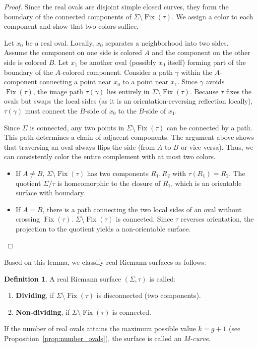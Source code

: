 \documentclass[11pt,a4paper]{article}
\theoremstyle{definition}
\newtheorem*{definition}{Definition}
\DeclareMathOperator{\fix}{\mathrm{Fix}}
\begin{document}
\begin{proof}
	Since the real ovals are disjoint simple closed curves, they form the boundary of the connected components of $\Sigma \setminus \fix(\tau)$. We assign a color to each component and show that two colors suffice.
	
	Let $x_0$ be a real oval. Locally, $x_0$ separates a neighborhood into two sides. Assume the component on one side is colored $A$ and the component on the other side is colored $B$. Let $x_1$ be another oval (possibly $x_0$ itself) forming part of the boundary of the $A$-colored component. Consider a path $\gamma$ within the $A$-component connecting a point near $x_0$ to a point near $x_1$.
	Since $\gamma$ avoids $\fix(\tau)$, the image path $\tau(\gamma)$ lies entirely in $\Sigma \setminus \fix(\tau)$. Because $\tau$ fixes the ovals but swaps the local sides (as it is an orientation-reversing reflection locally), $\tau(\gamma)$ must connect the $B$-side of $x_0$ to the $B$-side of $x_1$.
	
	Since $\Sigma$ is connected, any two points in $\Sigma \setminus \fix(\tau)$ can be connected by a path. This path determines a chain of adjacent components. The argument above shows that traversing an oval always flips the side (from $A$ to $B$ or vice versa). Thus, we can consistently color the entire complement with at most two colors.
	\begin{itemize}
		\item If $A \neq B$, $\Sigma \setminus \fix(\tau)$ has two components $R_1, R_2$ with $\tau(R_1) = R_2$. The quotient $\Sigma/\tau$ is homeomorphic to the closure of $R_1$, which is an orientable surface with boundary.
		\item If $A = B$, there is a path connecting the two local sides of an oval without crossing $\fix(\tau)$. $\Sigma \setminus \fix(\tau)$ is connected. Since $\tau$ reverses orientation, the projection to the quotient yields a non-orientable surface. \qedhere
	\end{itemize}
\end{proof}

Based on this lemma, we classify real Riemann surfaces as follows:

\begin{definition}
	A real Riemann surface $(\Sigma, \tau)$ is called:
	\begin{enumerate}
		\item[(i)] \textbf{Dividing}, if $\Sigma \setminus \fix(\tau)$ is disconnected (two components).
		\item[(ii)] \textbf{Non-dividing}, if $\Sigma \setminus \fix(\tau)$ is connected.
	\end{enumerate}
	If the number of real ovals attains the maximum possible value $k = g+1$ (see Proposition~\ref{prop:number_ovals}), the surface is called an \emph{M-curve}.
\end{definition}
\end{document}
